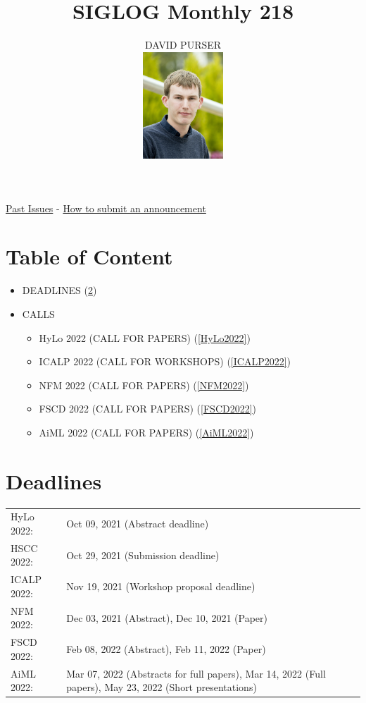 \documentclass[prodmode,acmtecs]{acmsmall} %
\newcounter{colstart}
\begin{document}
\setcounter{colstart}{\thepage}

\title{\huge\sc SIGLOG Monthly 218}
\author{DAVID PURSER
\vspace*{-2.6cm}\begin{flushright}\includegraphics[width=30mm]{dp}\end{flushright}
}

\maketitlee

\href{https://lics.siglog.org/newsletters/}{Past Issues}
 - 
\href{https://lics.siglog.org/newsletters/inst.html}{How to submit an announcement}
\section{Table of Content}\begin{itemize}\item DEADLINES (\cref{deadlines}) 
 
\item CALLS 
 
\begin{itemize}\item HyLo 2022 (CALL FOR PAPERS) (\cref{HyLo2022})
\item ICALP 2022 (CALL FOR WORKSHOPS) (\cref{ICALP2022})
\item NFM 2022 (CALL FOR PAPERS) (\cref{NFM2022})
\item FSCD 2022 (CALL FOR PAPERS) (\cref{FSCD2022})
\item AiML 2022 (CALL FOR PAPERS) (\cref{AiML2022})
\end{itemize} 
\end{itemize}\section{Deadlines}\label{deadlines}\begin{tabulary}{\linewidth}{LL}HyLo 2022:  & Oct 09, 2021 (Abstract  deadline) \\
HSCC 2022:  & Oct 29, 2021 (Submission deadline) \\
ICALP 2022:  & Nov 19, 2021 (Workshop proposal deadline) \\
NFM 2022:  & Dec 03, 2021 (Abstract), Dec 10, 2021 (Paper) \\
FSCD 2022:  & Feb 08, 2022 (Abstract), Feb 11, 2022 (Paper) \\
AiML 2022:  & Mar 07, 2022 (Abstracts for full papers), Mar 14, 2022 (Full papers), May 23, 2022 (Short presentations) \\
\end{tabulary}
\end{document}
